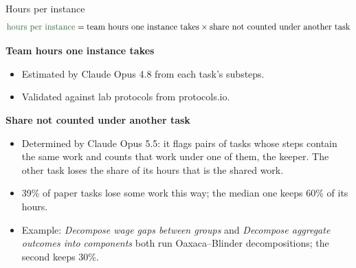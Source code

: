\documentclass[aspectratio=169,11pt]{beamer}
\newcommand{\HI}[1]{{\color{lagreen}#1}}        %
\newcommand{\tx}[1]{\text{#1}}
\newcommand{\divider}{\par\vspace{0.3em}{\color{lablue!30}\rule{\linewidth}{1pt}}\par\vspace{0.2em}}
\newcommand{\desc}[1]{{\color{lablue!70}#1}}
\begin{document}
\begin{frame}{\HI{Hours per instance}}
\begingroup\small
\[
\HI{\tx{hours per instance}} = \tx{team hours one instance takes} \times \tx{share not counted under another task}
\]
\endgroup
\vspace{-0.8em}
\divider
\small
\textbf{Team hours one instance takes}
\begin{itemize}
  \item Estimated by Claude Opus 4.8 from each task's substeps.
  \item Validated against lab protocols from protocols.io.
\end{itemize}
\vspace{0.1em}
\textbf{Share not counted under another task}
\begin{itemize}
  \item Determined by Claude Opus 5.5: it flags pairs of tasks whose steps contain the same work and counts that work
  under one of them, the keeper. The other task loses the share of its hours that is the shared work.
  \item \desc{39\% of paper tasks lose some work this way; the median one keeps 60\% of its hours.}
  \item \desc{Example: \emph{Decompose wage gaps between groups} and \emph{Decompose aggregate outcomes into components}
  both run Oaxaca--Blinder decompositions; the second keeps 30\%.}
\end{itemize}
\end{frame}
\end{document}
